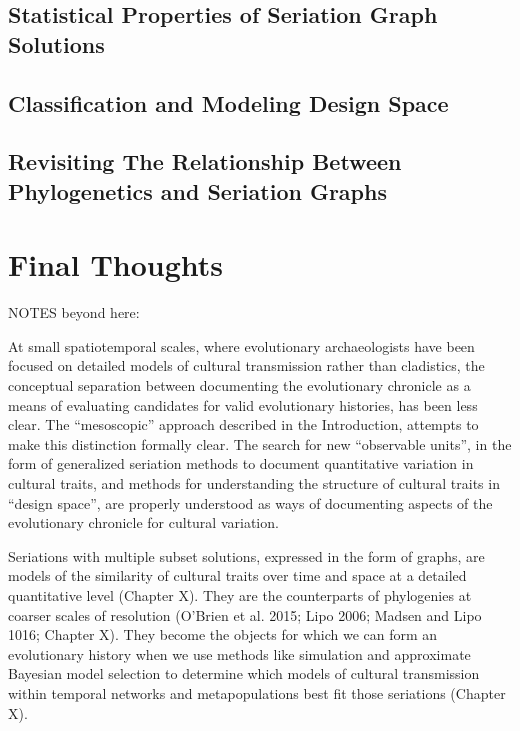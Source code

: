\subsection{Statistical Properties of Seriation Graph Solutions}\label{conc:sec:future-seriation-structure}



\subsection{Classification and Modeling Design Space}\label{conc:sec:future-design-space}




\subsection{Revisiting The Relationship Between Phylogenetics and Seriation Graphs}\label{conc:sec:future-relationship-macro-meso}



\section{Final Thoughts}\label{conc:sec:final-thoughts}


 

NOTES beyond here:

At small spatiotemporal scales, where evolutionary archaeologists have been focused on detailed models of cultural transmission rather than cladistics, the conceptual separation between documenting the evolutionary chronicle as a means of evaluating candidates for valid evolutionary histories, has been less clear.  The “mesoscopic” approach described in the Introduction, attempts to make this distinction formally clear.  The search for new “observable units”, in the form of generalized seriation methods to document quantitative variation in cultural traits, and methods for understanding the structure of cultural traits in “design space”, are properly understood as ways of documenting aspects of the evolutionary chronicle for cultural variation.  

Seriations with multiple subset solutions, expressed in the form of graphs, are models of the similarity of cultural traits over time and space at a detailed quantitative level (Chapter X).  They are the counterparts of phylogenies at coarser scales of resolution (O’Brien et al. 2015; Lipo 2006; Madsen and Lipo 1016; Chapter X).  They become the objects for which we can form an evolutionary history when we use methods like simulation and approximate Bayesian model selection to determine which models of cultural transmission within temporal networks and metapopulations best fit those seriations (Chapter X).  

